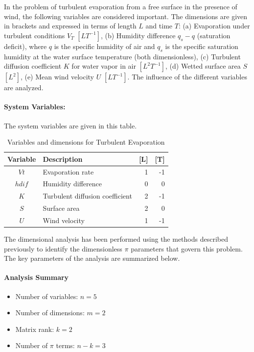 In the problem of turbulent evaporation from a free surface in the presence of wind, the following variables are considered important. The dimensions are given in brackets and expressed in terms of length $L$ and time $T$: (a) Evaporation under turbulent conditions $V_T$ $[LT^{-1}]$,  (b) Humidity difference $q_s-q$ (saturation deficit), where $q$ is the specific humidity of air and $q_s$ is the specific saturation humidity at the water surface temperature (both dimensionless), (c) Turbulent diffusion coefficient $K$ for water vapor in air $[L^2T^{-1}]$, (d) Wetted surface area $S$ $[L^2]$, (e) Mean wind velocity $U$ $[LT^{-1}]$. The influence of the different variables are analyzed.

\paragraph{System Variables: } The system variables are given in this table.

\begin{table}[H]
\centering
\begin{tabular}{|c|l|r|r|}
\hline
\textbf{Variable} & \textbf{Description} & \textbf{[L]} & \textbf{[T]} \\
\hline
$Vt$ & Evaporation rate & 1 & -1 \\
$hdif$ & Humidity difference & 0 & 0 \\
$K$ & Turbulent diffusion coefficient & 2 & -1 \\
$S$ & Surface area & 2 & 0 \\
$U$ & Wind velocity & 1 & -1 \\

\hline
\end{tabular}
\caption{Variables and dimensions for Turbulent Evaporation}
\end{table}

The dimensional analysis has been performed using the methods described previously to identify the dimensionless $\pi$ parameters that govern this problem. The key parameters of the analysis are summarized below.

\paragraph{Analysis Summary}
\begin{itemize}
\item Number of variables: $n = 5$
\item Number of dimensions: $m = 2$
\item Matrix rank: $k = 2$
\item Number of $\pi$ terms: $n - k = 3$
\end{itemize}

